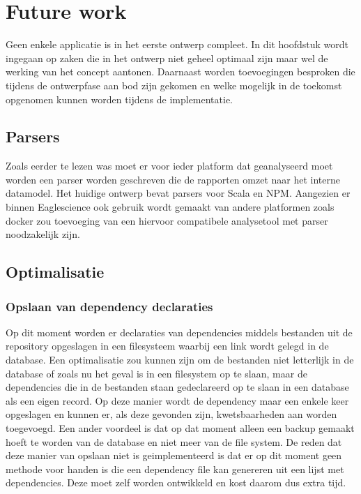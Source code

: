 
\chapter{Future work}\label{ch:name} %
Geen enkele applicatie is in het eerste ontwerp compleet. In dit hoofdstuk wordt ingegaan op zaken die in het ontwerp niet geheel optimaal zijn maar wel de werking van het concept aantonen.
Daarnaast worden toevoegingen besproken die tijdens de ontwerpfase aan bod zijn gekomen en welke mogelijk in de toekomst opgenomen kunnen worden tijdens de implementatie.


\section{Parsers}\label{sec:parsers}
Zoals eerder te lezen was moet er voor ieder platform dat geanalyseerd moet worden een parser worden geschreven die de rapporten omzet naar het interne datamodel. Het huidige ontwerp bevat parsers voor Scala en NPM. Aangezien er binnen Eaglescience ook gebruik wordt gemaakt van andere platformen zoals docker zou toevoeging van een hiervoor compatibele analysetool met parser noodzakelijk zijn.

\section{Optimalisatie}\label{sec:optimalisatie}

\subsection{Opslaan van dependency declaraties}\label{subsec:opslaan-van-dependency-declaraties}
Op dit moment worden er declaraties van dependencies middels bestanden uit de repository opgeslagen in een filesysteem waarbij een link wordt gelegd in de database. Een optimalisatie zou kunnen zijn om de bestanden niet letterlijk in de database of zoals nu het geval is in een filesystem op te slaan, maar de dependencies die in de bestanden staan gedeclareerd op te slaan in een database als een eigen record. Op deze manier wordt de dependency maar een enkele keer opgeslagen en kunnen er, als deze gevonden zijn, kwetsbaarheden aan worden toegevoegd. Een ander voordeel is dat op dat moment alleen een backup gemaakt hoeft te worden van de database en niet meer van de file system. De reden dat deze manier van opslaan niet is geimplementeerd is dat er op dit moment geen methode voor handen is die een dependency file kan genereren uit een lijst met dependencies. Deze moet zelf worden ontwikkeld en kost daarom dus extra tijd. %


